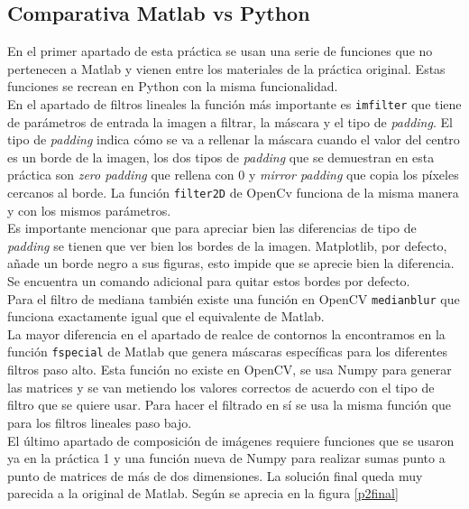 \documentclass[a4paper,12pt]{report}
\begin{document}
\subsection{Comparativa Matlab vs Python}

En el primer apartado de esta práctica se usan una serie de funciones que no pertenecen a Matlab y vienen entre los materiales de la práctica original. Estas funciones se recrean en Python con la misma funcionalidad.\\

En el apartado de filtros lineales la función más importante es \texttt{imfilter} que tiene de parámetros de entrada la imagen a filtrar, la máscara y el tipo de \emph{padding}. El tipo de \emph{padding} indica cómo se va a rellenar la máscara cuando el valor del centro es un borde de la imagen, los dos tipos de \emph{padding} que se demuestran en esta práctica son \emph{zero padding} que rellena con 0 y \emph{mirror padding} que copia los píxeles cercanos al borde. La función \texttt{filter2D} de OpenCv funciona de la misma manera y con los mismos parámetros.\\

Es importante mencionar que para apreciar bien las diferencias de tipo de \emph{padding} se tienen que ver bien los bordes de la imagen. Matplotlib, por defecto, añade un borde negro a sus figuras, esto impide que se aprecie bien la diferencia. Se encuentra un comando adicional para quitar estos bordes por defecto.\\

Para el filtro de mediana también existe una función en OpenCV \texttt{medianblur} que funciona exactamente igual que el equivalente de Matlab.\\

La mayor diferencia en el apartado de realce de contornos la encontramos en la función \texttt{fspecial} de Matlab que genera máscaras específicas para los diferentes filtros paso alto. Esta función no existe en OpenCV, se usa Numpy para generar las matrices y se van metiendo los valores correctos de acuerdo con el tipo de filtro que se quiere usar. Para hacer el filtrado en sí se usa la misma función que para los filtros lineales paso bajo.\\

El último apartado de composición de imágenes requiere funciones que se usaron ya en la práctica 1 y una función nueva de Numpy para realizar sumas punto a punto de matrices de más de dos dimensiones. La solución final queda muy parecida a la original de Matlab. Según se aprecia en la figura \ref {p2final}\\
\end{document}

